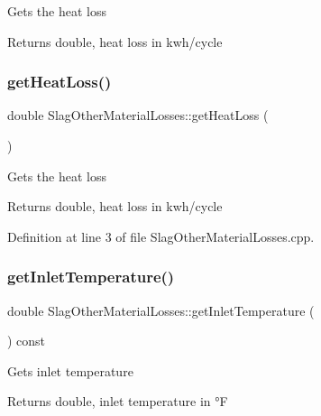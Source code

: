 Gets the heat loss \begin{DoxyReturn}{Returns}
double, heat loss in kwh/cycle 
\end{DoxyReturn}
\mbox{\label{class_slag_other_material_losses_a4c96a826ef6da38f4c27f7efd8b4a7ba}} 
\subsubsection{\texorpdfstring{get\+Heat\+Loss()}{getHeatLoss()}\hspace{0.1cm}{\footnotesize\ttfamily [3/3]}}
{\footnotesize\ttfamily double Slag\+Other\+Material\+Losses\+::get\+Heat\+Loss (\begin{DoxyParamCaption}{ }\end{DoxyParamCaption})}

Gets the heat loss \begin{DoxyReturn}{Returns}
double, heat loss in kwh/cycle 
\end{DoxyReturn}


Definition at line 3 of file Slag\+Other\+Material\+Losses.\+cpp.

\mbox{\label{class_slag_other_material_losses_aebd0f1b7d6c4bf0deb8ce8a86c5a80a7}} 
\subsubsection{\texorpdfstring{get\+Inlet\+Temperature()}{getInletTemperature()}\hspace{0.1cm}{\footnotesize\ttfamily [1/3]}}
{\footnotesize\ttfamily double Slag\+Other\+Material\+Losses\+::get\+Inlet\+Temperature (\begin{DoxyParamCaption}{ }\end{DoxyParamCaption}) const\hspace{0.3cm}{\ttfamily [inline]}}

Gets inlet temperature \begin{DoxyReturn}{Returns}
double, inlet temperature in °F 
\end{DoxyReturn}



